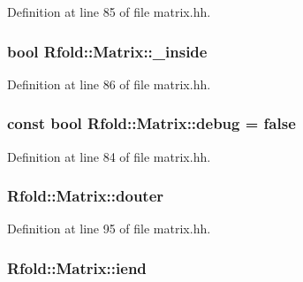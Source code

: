 Definition at line 85 of file matrix.\+hh.

\hypertarget{class_rfold_1_1_matrix_ab5046ea9c3952f87a52002fa583d1e1b}{
\subsubsection[{\+\_\+inside}]{\setlength{\rightskip}{0pt plus 5cm}bool Rfold\+::\+Matrix\+::\+\_\+inside}}\label{class_rfold_1_1_matrix_ab5046ea9c3952f87a52002fa583d1e1b}


Definition at line 86 of file matrix.\+hh.

\hypertarget{class_rfold_1_1_matrix_ad9a9131f0d234138b757dbe76fe62b28}{
\subsubsection[{debug}]{\setlength{\rightskip}{0pt plus 5cm}const bool Rfold\+::\+Matrix\+::debug = false\hspace{0.3cm}{\ttfamily [static]}}}\label{class_rfold_1_1_matrix_ad9a9131f0d234138b757dbe76fe62b28}


Definition at line 84 of file matrix.\+hh.

\hypertarget{class_rfold_1_1_matrix_a95f02edbb0a09ccd75a47f3baf50d1fe}{
\subsubsection[{douter}]{ Rfold\+::\+Matrix\+::douter}}\label{class_rfold_1_1_matrix_a95f02edbb0a09ccd75a47f3baf50d1fe}


Definition at line 95 of file matrix.\+hh.

\hypertarget{class_rfold_1_1_matrix_a2b367dc68757e1459981f18afd9c8ab8}{
\subsubsection[{iend}]{ Rfold\+::\+Matrix\+::iend}}\label{class_rfold_1_1_matrix_a2b367dc68757e1459981f18afd9c8ab8}


